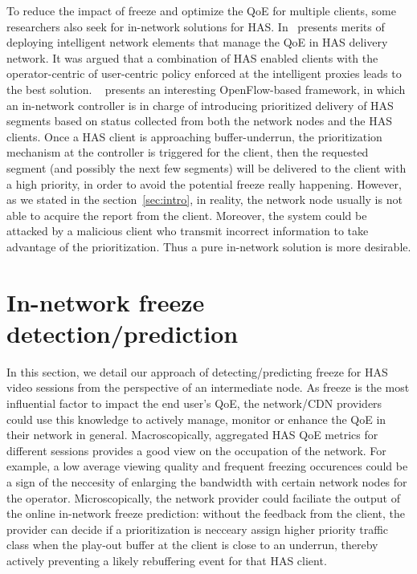 \documentclass[journal]{IEEEtran}
\begin{document}
To reduce the impact of freeze and optimize the QoE for multiple clients, some researchers also seek for in-network solutions for HAS. In~\cite{bouten2012qoe, bouten2015qoe} presents merits of deploying intelligent network elements that manage the QoE in HAS delivery network. It was argued that a combination of HAS enabled clients with the operator-centric of user-centric policy enforced at the intelligent proxies leads to the best solution. 
~\cite{Petrangeli:qcman15} presents an interesting OpenFlow-based framework, in which an in-network controller is in charge of introducing prioritized delivery of HAS segments based on status collected from both the network nodes and the HAS clients. Once a HAS client is approaching buffer-underrun, the prioritization mechanism at the controller is triggered for the client, then the requested segment (and possibly the next few segments) will be delivered to the client with a high priority, in order to avoid the potential freeze really happening. However, as we stated in the section~\ref{sec:intro}, in reality, the network node usually is not able to acquire the report from the client. Moreover, the system could be attacked by a malicious client who transmit incorrect information to take advantage of the prioritization. Thus a pure in-network solution is more desirable.



\section{In-network freeze detection/prediction}
\label{sec:framework}
In this section, we detail our approach of detecting/predicting freeze for HAS video sessions from the perspective of an intermediate node. As freeze is the most influential factor to impact the end user's QoE, the network/CDN providers could use this knowledge to actively manage, monitor or enhance the QoE in their network in general. Macroscopically, aggregated HAS QoE metrics for different sessions provides a good view on the occupation of the network. For example, a low average viewing quality and frequent freezing occurences could be a sign of the neccesity of enlarging the bandwidth with certain network nodes for the operator. Microscopically, the network provider could faciliate the output of the online in-network freeze prediction: without the feedback from the client, the provider can decide if a prioritization is necceary assign higher priority traffic class when the play-out buffer at the client is close to an underrun, thereby actively preventing a likely rebuffering event for that HAS client.
\end{document}
